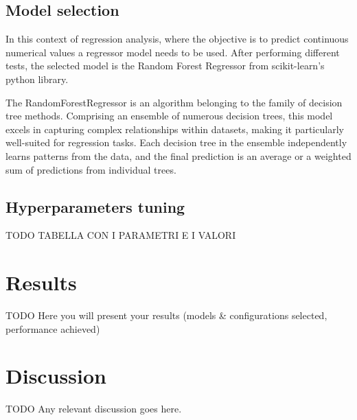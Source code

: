\documentclass[conference]{IEEEtran}
\begin{document}
\subsection{Model selection}
In this context of regression analysis, where the objective is to predict continuous numerical values 
a regressor model needs to be used. After performing different tests, the selected model is the 
Random Forest Regressor from scikit-learn's python library.

The RandomForestRegressor is an algorithm belonging to the family of decision tree methods. 
Comprising an ensemble of numerous decision trees, this model excels in capturing complex 
relationships within datasets, making it particularly well-suited for regression tasks. 
Each decision tree in the ensemble independently learns patterns from the data, and the 
final prediction is an average or a weighted sum of predictions 
from individual trees. \cite{OpenAI_ChatGPT_help_me_on_this} 


\subsection{Hyperparameters tuning}
TODO
TABELLA CON I PARAMETRI E I VALORI

\section{Results}
TODO
Here you will present your results (models \& configurations selected, performance achieved)

\section{Discussion}
TODO
Any relevant discussion goes here.



\end{document}

